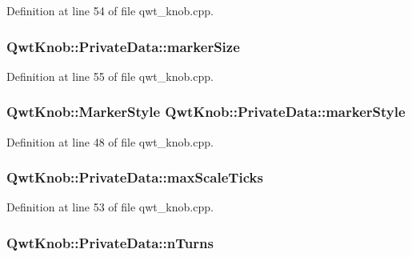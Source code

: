 Definition at line 54 of file qwt\-\_\-knob.\-cpp.

\hypertarget{class_qwt_knob_1_1_private_data_aafdc01e15e29179204ef857ddfb684a5}{
\subsubsection[{marker\-Size}]{ Qwt\-Knob\-::\-Private\-Data\-::marker\-Size}}\label{class_qwt_knob_1_1_private_data_aafdc01e15e29179204ef857ddfb684a5}


Definition at line 55 of file qwt\-\_\-knob.\-cpp.

\hypertarget{class_qwt_knob_1_1_private_data_a6a26015946d1dcdc996a5cfd31df6511}{
\subsubsection[{marker\-Style}]{\setlength{\rightskip}{0pt plus 5cm}Qwt\-Knob\-::\-Marker\-Style Qwt\-Knob\-::\-Private\-Data\-::marker\-Style}}\label{class_qwt_knob_1_1_private_data_a6a26015946d1dcdc996a5cfd31df6511}


Definition at line 48 of file qwt\-\_\-knob.\-cpp.

\hypertarget{class_qwt_knob_1_1_private_data_ac0d5d7e973fe89b326b2c2d85e4d2377}{
\subsubsection[{max\-Scale\-Ticks}]{ Qwt\-Knob\-::\-Private\-Data\-::max\-Scale\-Ticks}}\label{class_qwt_knob_1_1_private_data_ac0d5d7e973fe89b326b2c2d85e4d2377}


Definition at line 53 of file qwt\-\_\-knob.\-cpp.

\hypertarget{class_qwt_knob_1_1_private_data_a812191d83dcb643c9f688ae81e97287e}{
\subsubsection[{n\-Turns}]{ Qwt\-Knob\-::\-Private\-Data\-::n\-Turns}}\label{class_qwt_knob_1_1_private_data_a812191d83dcb643c9f688ae81e97287e}


